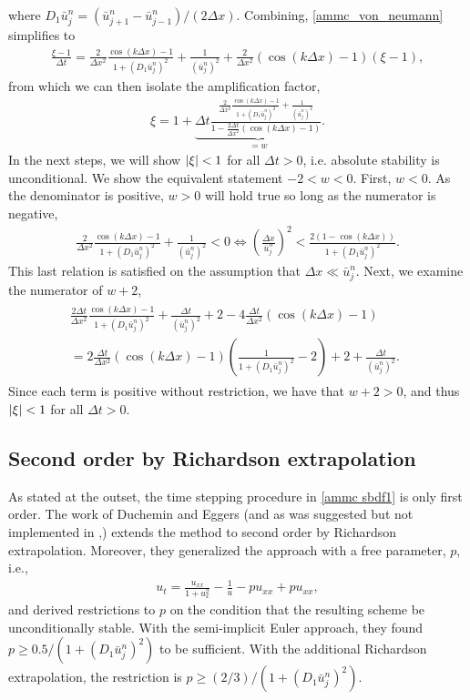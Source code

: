 where $D_1\bar u^n_j = (\bar u^n_{j+1} -  \bar u^n_{j-1})/(2\Delta x)$.
Combining, \eqref{ammc_von_neumann} simplifies to 
\begin{align}
        \frac{\xi - 1}{\Delta t} 
= \frac{2}{\Delta x^2}\frac{\cos(k\Delta x)-1}{1 +(
	D_1\bar u^n_j 
	)^2}
+ \frac{1}{(\bar u_j^n)^2}
+ \frac{2}{\Delta x^2}(\cos(k\Delta x)-1)(\xi-1),
\end{align}
from which we can then isolate the amplification factor,
\begin{align}
        \xi 
= 1+\underbrace{\Delta t \frac{\frac{2}{\Delta x^2}\frac{\cos(k\Delta x)-1}{1 +(
	D_1\bar u^n_j 
	)^2}
+ \frac{1}{(\bar u_j^n)^2}}{1-\frac{2\Delta t}{\Delta x^2}(\cos(k\Delta x)-1)}}_{=w}.
\end{align}
In the next steps, we will show $\left|\xi\right| < 1$ for all $\Delta t > 0$, i.e. absolute stability is unconditional. We show the equivalent statement $-2 < w < 0$. First, $w<0$. As the denominator is positive, $w>0$ will hold true so long as the numerator is negative, 
\begin{align}
\frac{2}{\Delta x^2}\frac{\cos(k\Delta x)-1}{1 +(
	D_1\bar u^n_j 
	)^2}
+ \frac{1}{(\bar u_j^n)^2} < 0 
\iff 
\left(\frac{\Delta x}{\bar u^n_j} \right)^2 
< \frac{2(1-\cos(k\Delta x))}{1 + (D_1\bar u^n_j)^2}.
\end{align}
This last relation is satisfied on the assumption that $\Delta x \ll \bar u^n_j$.  Next, we examine the numerator of $w+2$,
\begin{align}
\begin{split}
  \frac{2\Delta t}{\Delta x^2}\frac{\cos(k\Delta x)-1}{1 + (D_1 \bar u^n_j)^2} 
  + \frac{\Delta t}{(\bar u^n_j)^2} + 2 - 4\frac{\Delta t}{\Delta x^2}(\cos(k\Delta x)-1) 
  \phantom{aaaa}
\\
= 2\frac{\Delta t}{\Delta x^2}(\cos(k\Delta x)-1)\left(
\frac{1}{1 + (D_1 \bar u^n_j)^2} - 2 \right)
+ 2 + \frac{\Delta t}{(\bar u^n_j)^2}.
\end{split}
\end{align}
Since each term is positive without restriction, we have that $w+2 > 0$, and thus $\left|\xi\right| < 1$ for all $\Delta t > 0$.

\subsection{Second order by Richardson extrapolation}
As stated at the outset, the time stepping procedure in \eqref{ammc sbdf1} is only first order. The work of Duchemin and Eggers \cite{duchemin2014explicit} (and as was suggested but not implemented in \cite{smereka2003semi},) extends the method to second order by Richardson extrapolation.  Moreover, they generalized the approach with a free parameter, $p$, i.e.,
\begin{align}
u_t = \frac{u_{xx}}{1 + u_x^2} - \frac{1}{u} - pu_{xx} + pu_{xx}, 
\label{ammc p}
\end{align}
and derived restrictions to $p$ on the condition that the resulting scheme be unconditionally stable. With the semi-implicit Euler approach, they found $p \geq0.5/(1 + (D_1 \bar u^n_j)^2)$ to be sufficient. With the additional Richardson extrapolation, the restriction is $p \geq (2/3)/(1 + (D_1 \bar u^n_j)^2)$.

